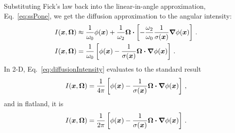 Substituting Fick's law back into the linear-in-angle approximation,
Eq.~\eqref{eq:ssPone}, we get the diffusion approximation to the angular
intensity:
\begin{align} \nonumber
  I(\bm{x}, \bm{\Omega})
  &\approx \frac{1}{\omega_0} \phi(\bm{x})
  + \frac{1}{\omega_2} \bm{\Omega} \bm{\cdot} \left[ - \frac{\omega_2}{\omega_0}
  \frac{1}{\sigma(\bm{x})} \bm{\nabla} \phi(\bm{x}) \right]\,.
  \\ \label{eq:diffusionIntensity}
  I(\bm{x}, \bm{\Omega})
  &= \frac{1}{\omega_0} \left[ \phi(\bm{x})
  - \frac{1}{\sigma(\bm{x})}
  \bm{\Omega} \bm{\cdot} \bm{\nabla} \phi(\bm{x}) \right] \,.
\end{align}
In 2-D, Eq.~\eqref{eq:diffusionIntensity} evaluates to the standard result
\begin{equation*}
 I(\bm{x}, \bm{\Omega})
= \frac{1}{4\pi} \left[ \phi(\bm{x}) - \frac{1}{\sigma(\bm{x})} \bm{\Omega}
\bm{\cdot} \bm{\nabla} \phi(\bm{x}) \right] \,,
\end{equation*}
and in flatland, it is
\begin{equation}\label{eq:flatlandDiffusion}
 I(\bm{x}, \bm{\Omega})
= \frac{1}{2\pi} \left[ \phi(\bm{x}) - \frac{1}{\sigma(\bm{x})} \bm{\Omega}
\bm{\cdot} \bm{\nabla} \phi(\bm{x}) \right]\,.
\end{equation}

